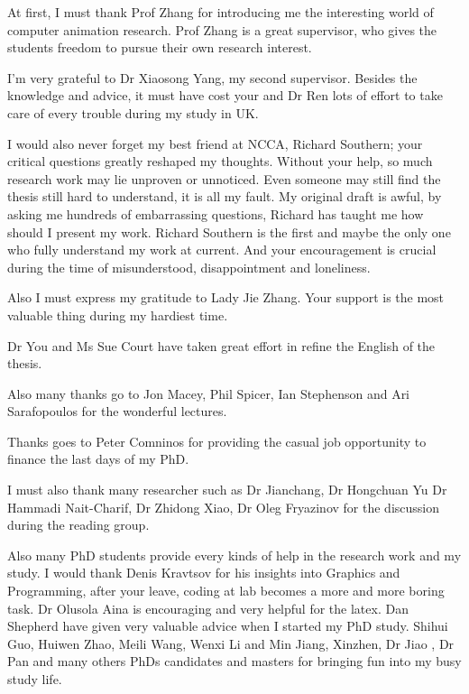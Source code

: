 

\begin{acknowledgements}      %

At first, I must thank Prof Zhang for introducing me the interesting world of computer animation research.
Prof Zhang is a great supervisor, who gives the students freedom to pursue their own research interest. 
 
I'm very grateful to Dr Xiaosong Yang, my second supervisor.
Besides the knowledge and advice, it must have cost your and Dr Ren lots of effort to take care of every trouble during my study in UK.
 
I would also never forget my best friend at NCCA, Richard Southern; your critical questions greatly reshaped my thoughts.
Without your help, so much research work may lie unproven or unnoticed.
Even someone may still find the thesis still hard to understand, it is all my fault.
My original draft is awful, by asking me hundreds of embarrassing questions, Richard has taught me how should I present my work.
Richard Southern is the first and maybe the only one who fully understand my work at current.
 And your encouragement is crucial during the time of misunderstood, disappointment and loneliness.

Also I must express my gratitude to  Lady Jie Zhang. 
Your support is the most valuable thing during my hardiest time.

Dr You and Ms Sue Court have taken great effort in refine the English of the thesis.


Also many thanks go to Jon Macey, Phil Spicer, Ian Stephenson and  Ari Sarafopoulos for the wonderful lectures.

Thanks goes to Peter Comninos  for providing the casual job opportunity to finance the last days of my PhD.

I must also thank many researcher such as Dr Jianchang, Dr Hongchuan Yu Dr Hammadi Nait-Charif, Dr Zhidong Xiao, Dr Oleg Fryazinov for the discussion during the reading group.






Also many PhD students provide every kinds of help in the research work and my study.
I would thank Denis Kravtsov for his insights into Graphics and Programming, after your leave, coding at lab becomes a more and more  boring task. 
Dr Olusola Aina is encouraging and very helpful for the latex.
Dan Shepherd have given  very valuable advice when I started my PhD study.
Shihui Guo, Huiwen Zhao, Meili Wang, Wenxi Li and Min Jiang, Xinzhen, Dr Jiao , Dr Pan and many others PhDs candidates and masters for  bringing fun into my busy study life.



\end{acknowledgements}
